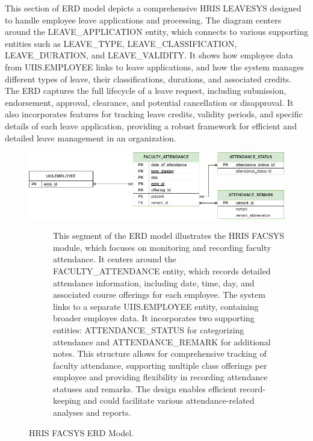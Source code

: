     This section of ERD model depicts a comprehensive HRIS LEAVESYS designed to handle employee leave applications and processing. The diagram centers around the LEAVE\_APPLICATION entity, which connects to various supporting entities such as LEAVE\_TYPE, LEAVE\_CLASSIFICATION, LEAVE\_DURATION, and LEAVE\_VALIDITY. It shows how employee data from UIIS.EMPLOYEE links to leave applications, and how the system manages different types of leave, their classifications, durations, and associated credits. The ERD captures the full lifecycle of a leave request, including submission, endorsement, approval, clearance, and potential cancellation or disapproval. It also incorporates features for tracking leave credits, validity periods, and specific details of each leave application, providing a robust framework for efficient and detailed leave management in an organization.

    \begin{figure}[H]
        \centering
        \includegraphics[width=1\linewidth]{figures/images/erd-facsys.png}
        \caption{HRIS FACSYS ERD Model.}
        \begin{description}
            \item[] This segment of the ERD model illustrates the HRIS FACSYS module, which focuses on monitoring and recording faculty attendance. It centers around the FACULTY\_ATTENDANCE entity, which records detailed attendance information, including date, time, day, and associated course offerings for each employee. The system links to a separate UIIS.EMPLOYEE entity, containing broader employee data. It incorporates two supporting entities: ATTENDANCE\_STATUS for categorizing attendance and ATTENDANCE\_REMARK for additional notes. This structure allows for comprehensive tracking of faculty attendance, supporting multiple class offerings per employee and providing flexibility in recording attendance statuses and remarks. The design enables efficient record-keeping and could facilitate various attendance-related analyses and reports.
        \end{description}
        \label{fig:erd-facsys}
    \end{figure}
    
